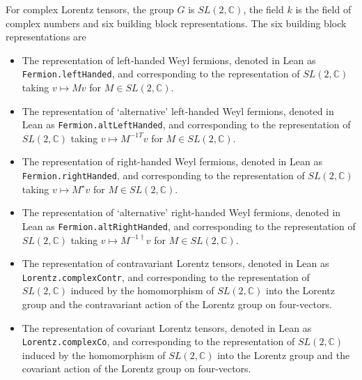 \documentclass[a4paper, 11pt]{article}
\begin{document}
For complex Lorentz tensors, the group $G$ is $SL(2, \mathbb{C})$, the field $k$ is the 
field of complex numbers and six building block representations. The six building block representations 
are
\begin{itemize}
  \item The representation of left-handed Weyl fermions, 
    denoted in Lean as \lstinline|Fermion.leftHanded|, and corresponding to the 
    representation of $SL(2, \mathbb{C})$ taking $v \mapsto M v$ for $M \in SL(2, \mathbb{C})$.
  \item The representation of `alternative' left-handed Weyl fermions, 
    denoted in Lean as \lstinline|Fermion.altLeftHanded|, and corresponding to the 
    representation of $SL(2, \mathbb{C})$ taking $v \mapsto M^{-1 T} v$ for $M \in SL(2, \mathbb{C})$.
  \item The representation of right-handed Weyl fermions, 
    denoted in Lean as \lstinline|Fermion.rightHanded|, and corresponding to the 
    representation of $SL(2, \mathbb{C})$ taking $v \mapsto M^\star v$ for $M \in SL(2, \mathbb{C})$.
  \item The representation of `alternative' right-handed Weyl fermions,
    denoted in Lean as \lstinline|Fermion.altRightHanded|, and corresponding to the 
    representation of $SL(2, \mathbb{C})$ taking $v \mapsto M^{-1 \dagger} v$ for $M \in SL(2, \mathbb{C})$.
  \item The representation of contravariant Lorentz tensors, 
    denoted in Lean as \lstinline|Lorentz.complexContr|, and corresponding to the 
    representation of $SL(2, \mathbb{C})$ induced by the homomorphism of $SL(2, \mathbb{C})$ into 
    the Lorentz group and the contravariant action of the Lorentz group on four-vectors.
  \item The representation of covariant Lorentz tensors,
     denoted in Lean as \lstinline|Lorentz.complexCo|, and corresponding to the 
    representation of $SL(2, \mathbb{C})$ induced by the homomorphism of $SL(2, \mathbb{C})$ into 
    the Lorentz group and the covariant action of the Lorentz group on four-vectors.
\end{itemize}
\end{document}
